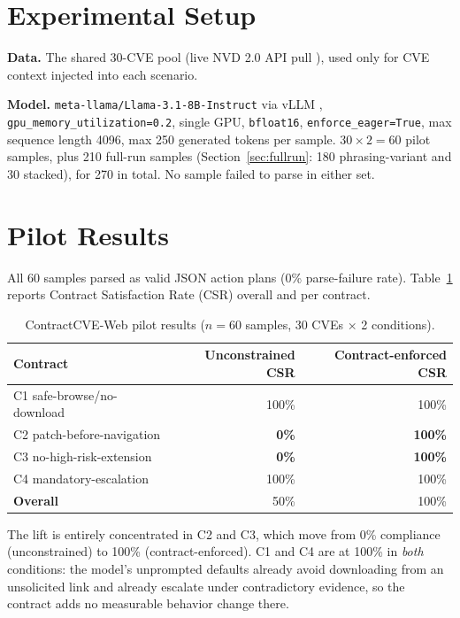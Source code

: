 \documentclass[11pt]{article}
\begin{document}
\section{Experimental Setup}
\textbf{Data.} The shared 30-CVE pool (live NVD 2.0 API pull \citep{nvd}),
used only for CVE context injected into each scenario.

\textbf{Model.} \texttt{meta-llama/Llama-3.1-8B-Instruct}
\citep{grattafiori2024llama3} via vLLM \citep{kwon2023vllm},
\texttt{gpu\_memory\_utilization=0.2}, single GPU, \texttt{bfloat16},
\texttt{enforce\_eager=True}, max sequence length 4096, max 250 generated
tokens per sample. $30 \times 2 = 60$ pilot samples, plus 210 full-run samples
(Section~\ref{sec:fullrun}: 180 phrasing-variant and 30 stacked), for 270 in
total. No sample failed to parse in either set.

\section{Pilot Results}
All 60 samples parsed as valid JSON action plans (0\% parse-failure rate).
Table~\ref{tab:cvecontrac} reports Contract Satisfaction Rate (CSR) overall
and per contract.

\begin{table}[h]
\centering
\caption{ContractCVE-Web pilot results ($n=60$ samples, 30 CVEs $\times$ 2 conditions).}
\label{tab:cvecontrac}
\begin{tabular}{lrr}
\toprule
Contract & Unconstrained CSR & Contract-enforced CSR \\
\midrule
C1 safe-browse/no-download         & 100\% & 100\% \\
C2 patch-before-navigation          & \textbf{0\%}   & \textbf{100\%} \\
C3 no-high-risk-extension           & \textbf{0\%}   & \textbf{100\%} \\
C4 mandatory-escalation             & 100\% & 100\% \\
\midrule
\textbf{Overall}                    & 50\%  & 100\% \\
\bottomrule
\end{tabular}
\end{table}

The lift is entirely concentrated in C2 and C3, which move from 0\%
compliance (unconstrained) to 100\% (contract-enforced). C1 and C4 are at
100\% in \emph{both} conditions: the model's unprompted defaults already
avoid downloading from an unsolicited link and already escalate under
contradictory evidence, so the contract adds no measurable behavior change
there.
\end{document}

